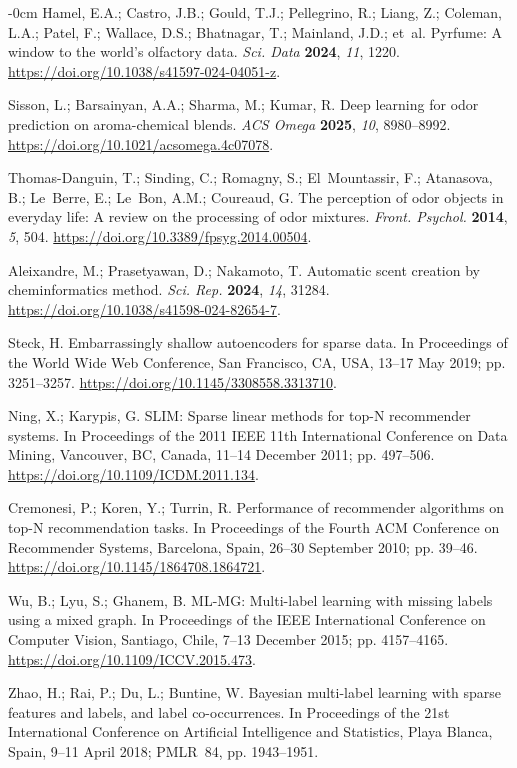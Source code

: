 \documentclass[10pt,a4paper]{article}
\newlength{\extralength}\setlength{\extralength}{3.7cm}
\renewenvironment{thebibliography}[1]{\nolinenumbers\small\list{\arabic{enumiv}.}{\settowidth\labelwidth{999.}\leftmargin\labelwidth\advance\leftmargin\labelsep\usecounter{enumiv}\itemsep 0pt}\sloppy}{\endlist}
\begin{document}
\begin{adjustwidth}{-\extralength}{0cm}
\begin{thebibliography}{999}
 Hamel, E.A.; Castro, J.B.; Gould, T.J.; Pellegrino, R.; Liang, Z.; Coleman, L.A.; Patel, F.; Wallace, D.S.; Bhatnagar, T.; Mainland, J.D.; et~al. Pyrfume: A window to the world's olfactory data. \emph{Sci. Data} \textbf{2024}, \emph{11}, 1220. \url{https://doi.org/10.1038/s41597-024-04051-z}.

 Sisson, L.; Barsainyan, A.A.; Sharma, M.; Kumar, R. Deep learning for odor prediction on aroma-chemical blends. \emph{ACS Omega} \textbf{2025}, \emph{10}, 8980--8992. \url{https://doi.org/10.1021/acsomega.4c07078}.

 Thomas-Danguin, T.; Sinding, C.; Romagny, S.; El~Mountassir, F.; Atanasova, B.; Le~Berre, E.; Le~Bon, A.M.; Coureaud, G. The perception of odor objects in everyday life: A review on the processing of odor mixtures. \emph{Front. Psychol.} \textbf{2014}, \emph{5}, 504. \url{https://doi.org/10.3389/fpsyg.2014.00504}.

 Aleixandre, M.; Prasetyawan, D.; Nakamoto, T. Automatic scent creation by cheminformatics method. \emph{Sci. Rep.} \textbf{2024}, \emph{14}, 31284. \url{https://doi.org/10.1038/s41598-024-82654-7}.

 Steck, H. Embarrassingly shallow autoencoders for sparse data. In Proceedings of the World Wide Web Conference, San Francisco, CA, USA, 13--17 May 2019; pp. 3251--3257. \url{https://doi.org/10.1145/3308558.3313710}.

 Ning, X.; Karypis, G. SLIM: Sparse linear methods for top-N recommender systems. In Proceedings of the 2011 IEEE 11th International Conference on Data Mining, Vancouver, BC, Canada, 11--14 December 2011; pp. 497--506. \url{https://doi.org/10.1109/ICDM.2011.134}.

 Cremonesi, P.; Koren, Y.; Turrin, R. Performance of recommender algorithms on top-N recommendation tasks. In Proceedings of the Fourth ACM Conference on Recommender Systems, Barcelona, Spain, 26--30 September 2010; pp. 39--46. \url{https://doi.org/10.1145/1864708.1864721}.

 Wu, B.; Lyu, S.; Ghanem, B. ML-MG: Multi-label learning with missing labels using a mixed graph. In Proceedings of the IEEE International Conference on Computer Vision, Santiago, Chile, 7--13 December 2015; pp. 4157--4165. \url{https://doi.org/10.1109/ICCV.2015.473}.

 Zhao, H.; Rai, P.; Du, L.; Buntine, W. Bayesian multi-label learning with sparse features and labels, and label co-occurrences. In Proceedings of the 21st International Conference on Artificial Intelligence and Statistics, Playa Blanca, Spain, 9--11 April 2018; PMLR~84, pp. 1943--1951.


\end{thebibliography}
\end{adjustwidth}
\end{document}
